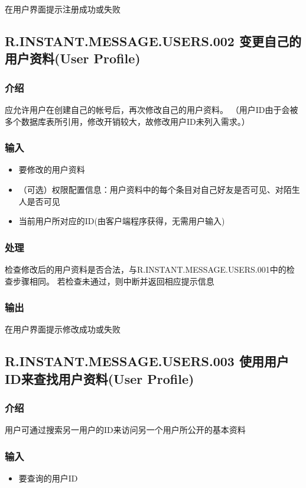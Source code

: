 在用户界面提示注册成功或失败

\subsection{R.INSTANT.MESSAGE.USERS.002 变更自己的用户资料(User Profile)}
\subsubsection{介绍}
应允许用户在创建自己的帐号后，再次修改自己的用户资料。
（用户ID由于会被多个数据库表所引用，修改开销较大，故修改用户ID未列入需求。）

\subsubsection{输入}
\begin{itemize}
	\item 要修改的用户资料
	\item （可选）权限配置信息：用户资料中的每个条目对自己好友是否可见、对陌生人是否可见
	\item 当前用户所对应的ID(由客户端程序获得，无需用户输入)
	\end{itemize}
\subsubsection{处理}
检查修改后的用户资料是否合法，与R.INSTANT.MESSAGE.USERS.001中的检查步骤相同。
若检查未通过，则中断并返回相应提示信息
\subsubsection{输出}
在用户界面提示修改成功或失败

\subsection{R.INSTANT.MESSAGE.USERS.003 使用用户ID来查找用户资料(User Profile)}
\subsubsection{介绍}
用户可通过搜索另一用户的ID来访问另一个用户所公开的基本资料
\subsubsection{输入}
\begin{itemize}
	\item 要查询的用户ID
	\end{itemize}
